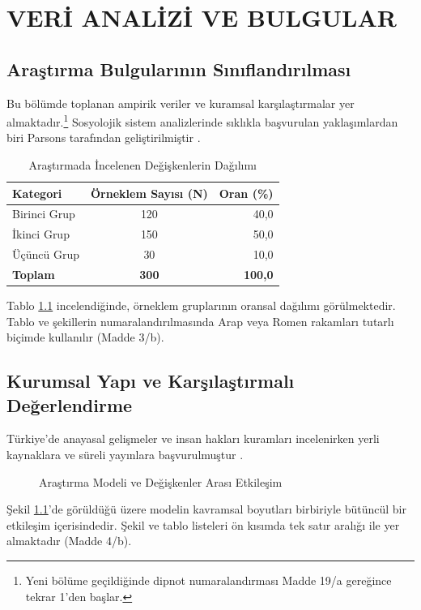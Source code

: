 \chapter{VERİ ANALİZİ VE BULGULAR}

\section{Araştırma Bulgularının Sınıflandırılması}

Bu bölümde toplanan ampirik veriler ve kuramsal karşılaştırmalar yer almaktadır.\footnote{Yeni bölüme geçildiğinde dipnot numaralandırması Madde 19/a gereğince tekrar 1'den başlar.} Sosyolojik sistem analizlerinde sıklıkla başvurulan yaklaşımlardan biri Parsons tarafından geliştirilmiştir \parencite{parsons_social_system}.

\begin{table}[htbp]
    \centering
    \caption{Araştırmada İncelenen Değişkenlerin Dağılımı}
    \label{tab:degiskenler}
    \begin{tabular}{|l|c|r|}
        \hline
        \textbf{Kategori} & \textbf{Örneklem Sayısı (N)} & \textbf{Oran (\%)} \\
        \hline
        Birinci Grup & 120 & 40,0 \\
        İkinci Grup  & 150 & 50,0 \\
        Üçüncü Grup  & 30  & 10,0 \\
        \hline
        \textbf{Toplam} & \textbf{300} & \textbf{100,0} \\
        \hline
    \end{tabular}
\end{table}

Tablo \ref{tab:degiskenler} incelendiğinde, örneklem gruplarının oransal dağılımı görülmektedir. Tablo ve şekillerin numaralandırılmasında Arap veya Romen rakamları tutarlı biçimde kullanılır (Madde 3/b).

\section{Kurumsal Yapı ve Karşılaştırmalı Değerlendirme}

Türkiye'de anayasal gelişmeler ve insan hakları kuramları incelenirken yerli kaynaklara ve süreli yayınlara başvurulmuştur \parencite{tanor_osmanli, kaboglu_dusunce}.

\begin{figure}[htbp]
    \centering
    \caption{Araştırma Modeli ve Değişkenler Arası Etkileşim}
    \label{fig:model}
\end{figure}

Şekil \ref{fig:model}'de görüldüğü üzere modelin kavramsal boyutları birbiriyle bütüncül bir etkileşim içerisindedir. Şekil ve tablo listeleri ön kısımda tek satır aralığı ile yer almaktadır (Madde 4/b).